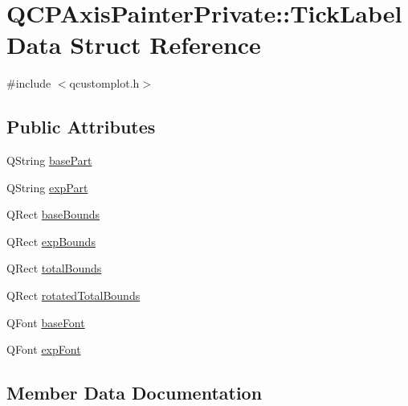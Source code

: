 \hypertarget{structQCPAxisPainterPrivate_1_1TickLabelData}{}\section{Q\+C\+P\+Axis\+Painter\+Private\+:\+:Tick\+Label\+Data Struct Reference}
\label{structQCPAxisPainterPrivate_1_1TickLabelData}


{\ttfamily \#include $<$qcustomplot.\+h$>$}

\subsection*{Public Attributes}
\begin{DoxyCompactItemize}
\item 
Q\+String \hyperlink{structQCPAxisPainterPrivate_1_1TickLabelData_ad65b76a5cafc412179a20b5d79809fc4}{base\+Part}
\item 
Q\+String \hyperlink{structQCPAxisPainterPrivate_1_1TickLabelData_a09692e4ea092137278b4ac051d5fdf2b}{exp\+Part}
\item 
Q\+Rect \hyperlink{structQCPAxisPainterPrivate_1_1TickLabelData_aac1047ae6ab8e9f5a42923082aabfff5}{base\+Bounds}
\item 
Q\+Rect \hyperlink{structQCPAxisPainterPrivate_1_1TickLabelData_a6722d2bcefb93011e9dc42301b966846}{exp\+Bounds}
\item 
Q\+Rect \hyperlink{structQCPAxisPainterPrivate_1_1TickLabelData_afbb3163cf4c628914f1b703945419ea5}{total\+Bounds}
\item 
Q\+Rect \hyperlink{structQCPAxisPainterPrivate_1_1TickLabelData_aa4d38c5ea47c9184a78ee33ae7f1012e}{rotated\+Total\+Bounds}
\item 
Q\+Font \hyperlink{structQCPAxisPainterPrivate_1_1TickLabelData_a0d4958a706debaa8d19a9b65fc090d56}{base\+Font}
\item 
Q\+Font \hyperlink{structQCPAxisPainterPrivate_1_1TickLabelData_adc10767ebcb719d6927c012a38b9d933}{exp\+Font}
\end{DoxyCompactItemize}


\subsection{Member Data Documentation}
